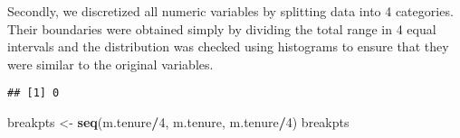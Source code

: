 \documentclass[
]{article}
\newenvironment{Shaded}{\begin{snugshade}}{\end{snugshade}}
\newcommand{\AttributeTok}[1]{\textcolor[rgb]{0.13,0.29,0.53}{#1}}
\newcommand{\CommentTok}[1]{\textcolor[rgb]{0.56,0.35,0.01}{\textit{#1}}}
\newcommand{\ConstantTok}[1]{\textcolor[rgb]{0.56,0.35,0.01}{#1}}
\newcommand{\ControlFlowTok}[1]{\textcolor[rgb]{0.13,0.29,0.53}{\textbf{#1}}}
\newcommand{\DecValTok}[1]{\textcolor[rgb]{0.00,0.00,0.81}{#1}}
\newcommand{\FunctionTok}[1]{\textcolor[rgb]{0.13,0.29,0.53}{\textbf{#1}}}
\newcommand{\NormalTok}[1]{#1}
\newcommand{\OtherTok}[1]{\textcolor[rgb]{0.56,0.35,0.01}{#1}}
\newcommand{\SpecialCharTok}[1]{\textcolor[rgb]{0.81,0.36,0.00}{\textbf{#1}}}
\begin{document}
Secondly, we discretized all numeric variables by splitting data into 4
categories. Their boundaries were obtained simply by dividing the total
range in 4 equal intervals and the distribution was checked using
histograms to ensure that they were similar to the original variables.

\begin{Shaded}
\end{Shaded}

\begin{verbatim}
## [1] 0
\end{verbatim}

\begin{Shaded}
\begin{Highlighting}[]
\NormalTok{breakpts }\OtherTok{\textless{}{-}} \FunctionTok{seq}\NormalTok{(m.tenure}\SpecialCharTok{/}\DecValTok{4}\NormalTok{, m.tenure, m.tenure}\SpecialCharTok{/}\DecValTok{4}\NormalTok{)}
\NormalTok{breakpts}
\end{Highlighting}
\end{Shaded}
\end{document}
